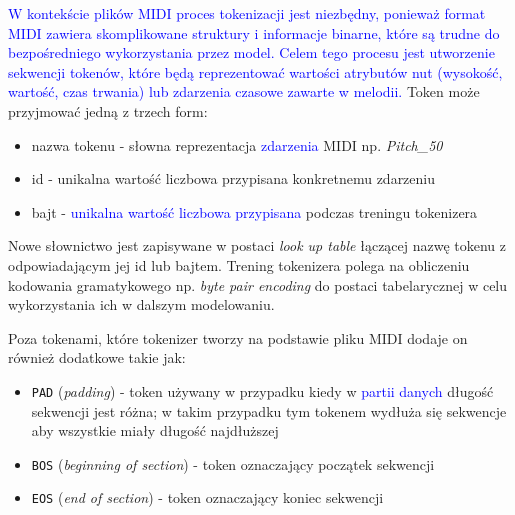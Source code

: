 \documentclass[data-science]{agh-wi} %
\begin{document}
\textcolor{blue}{W kontekście plików MIDI proces tokenizacji jest niezbędny, ponieważ format MIDI zawiera skomplikowane struktury i informacje binarne, które są trudne do bezpośredniego wykorzystania przez model. Celem tego procesu jest utworzenie sekwencji tokenów, które będą reprezentować wartości atrybutów nut (wysokość, wartość, czas trwania) lub zdarzenia czasowe zawarte w melodii.
}
Token może przyjmować jedną z trzech form:
\begin{itemize}
    \item nazwa tokenu - słowna reprezentacja \textcolor{blue}{zdarzenia} MIDI np. \textit{Pitch\_50}
    \item id - unikalna wartość liczbowa przypisana konkretnemu zdarzeniu
    \item bajt - \textcolor{blue}{unikalna wartość liczbowa przypisana} podczas treningu tokenizera
\end{itemize}

Nowe słownictwo jest zapisywane w postaci \textit{look up table} łączącej nazwę tokenu z odpowiadającym jej id lub bajtem. Trening tokenizera polega na obliczeniu kodowania gramatykowego np. \textit{byte pair encoding} do postaci tabelarycznej w celu wykorzystania ich w dalszym modelowaniu.

Poza tokenami, które tokenizer tworzy na podstawie pliku MIDI dodaje on również dodatkowe takie jak:
\begin{itemize}
    \item \texttt{PAD} (\textit{padding}) - token używany w przypadku kiedy w \textcolor{blue}{partii danych} długość sekwencji jest różna; w takim przypadku tym tokenem wydłuża się sekwencje aby wszystkie miały długość najdłuższej
    \item \texttt{BOS} (\textit{beginning of section}) - token oznaczający początek sekwencji
    \item \texttt{EOS} (\textit{end of section}) - token oznaczający koniec sekwencji
\end{itemize}
\end{document}
